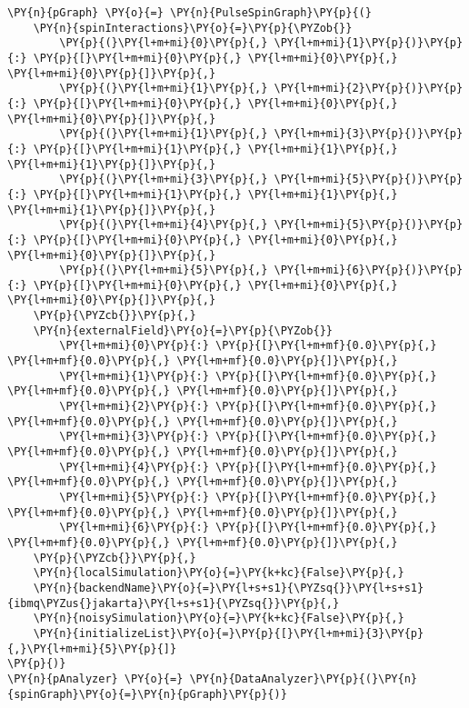     \begin{tcolorbox}[breakable, size=fbox, boxrule=1pt, pad at break*=1mm,colback=cellbackground, colframe=cellborder]
\begin{Verbatim}[commandchars=\\\{\}]
\PY{n}{pGraph} \PY{o}{=} \PY{n}{PulseSpinGraph}\PY{p}{(}
    \PY{n}{spinInteractions}\PY{o}{=}\PY{p}{\PYZob{}}
        \PY{p}{(}\PY{l+m+mi}{0}\PY{p}{,} \PY{l+m+mi}{1}\PY{p}{)}\PY{p}{:} \PY{p}{[}\PY{l+m+mi}{0}\PY{p}{,} \PY{l+m+mi}{0}\PY{p}{,} \PY{l+m+mi}{0}\PY{p}{]}\PY{p}{,}
        \PY{p}{(}\PY{l+m+mi}{1}\PY{p}{,} \PY{l+m+mi}{2}\PY{p}{)}\PY{p}{:} \PY{p}{[}\PY{l+m+mi}{0}\PY{p}{,} \PY{l+m+mi}{0}\PY{p}{,} \PY{l+m+mi}{0}\PY{p}{]}\PY{p}{,}
        \PY{p}{(}\PY{l+m+mi}{1}\PY{p}{,} \PY{l+m+mi}{3}\PY{p}{)}\PY{p}{:} \PY{p}{[}\PY{l+m+mi}{1}\PY{p}{,} \PY{l+m+mi}{1}\PY{p}{,} \PY{l+m+mi}{1}\PY{p}{]}\PY{p}{,}
        \PY{p}{(}\PY{l+m+mi}{3}\PY{p}{,} \PY{l+m+mi}{5}\PY{p}{)}\PY{p}{:} \PY{p}{[}\PY{l+m+mi}{1}\PY{p}{,} \PY{l+m+mi}{1}\PY{p}{,} \PY{l+m+mi}{1}\PY{p}{]}\PY{p}{,}
        \PY{p}{(}\PY{l+m+mi}{4}\PY{p}{,} \PY{l+m+mi}{5}\PY{p}{)}\PY{p}{:} \PY{p}{[}\PY{l+m+mi}{0}\PY{p}{,} \PY{l+m+mi}{0}\PY{p}{,} \PY{l+m+mi}{0}\PY{p}{]}\PY{p}{,}
        \PY{p}{(}\PY{l+m+mi}{5}\PY{p}{,} \PY{l+m+mi}{6}\PY{p}{)}\PY{p}{:} \PY{p}{[}\PY{l+m+mi}{0}\PY{p}{,} \PY{l+m+mi}{0}\PY{p}{,} \PY{l+m+mi}{0}\PY{p}{]}\PY{p}{,}
    \PY{p}{\PYZcb{}}\PY{p}{,}
    \PY{n}{externalField}\PY{o}{=}\PY{p}{\PYZob{}}
        \PY{l+m+mi}{0}\PY{p}{:} \PY{p}{[}\PY{l+m+mf}{0.0}\PY{p}{,} \PY{l+m+mf}{0.0}\PY{p}{,} \PY{l+m+mf}{0.0}\PY{p}{]}\PY{p}{,}
        \PY{l+m+mi}{1}\PY{p}{:} \PY{p}{[}\PY{l+m+mf}{0.0}\PY{p}{,} \PY{l+m+mf}{0.0}\PY{p}{,} \PY{l+m+mf}{0.0}\PY{p}{]}\PY{p}{,}
        \PY{l+m+mi}{2}\PY{p}{:} \PY{p}{[}\PY{l+m+mf}{0.0}\PY{p}{,} \PY{l+m+mf}{0.0}\PY{p}{,} \PY{l+m+mf}{0.0}\PY{p}{]}\PY{p}{,}
        \PY{l+m+mi}{3}\PY{p}{:} \PY{p}{[}\PY{l+m+mf}{0.0}\PY{p}{,} \PY{l+m+mf}{0.0}\PY{p}{,} \PY{l+m+mf}{0.0}\PY{p}{]}\PY{p}{,}
        \PY{l+m+mi}{4}\PY{p}{:} \PY{p}{[}\PY{l+m+mf}{0.0}\PY{p}{,} \PY{l+m+mf}{0.0}\PY{p}{,} \PY{l+m+mf}{0.0}\PY{p}{]}\PY{p}{,}
        \PY{l+m+mi}{5}\PY{p}{:} \PY{p}{[}\PY{l+m+mf}{0.0}\PY{p}{,} \PY{l+m+mf}{0.0}\PY{p}{,} \PY{l+m+mf}{0.0}\PY{p}{]}\PY{p}{,}
        \PY{l+m+mi}{6}\PY{p}{:} \PY{p}{[}\PY{l+m+mf}{0.0}\PY{p}{,} \PY{l+m+mf}{0.0}\PY{p}{,} \PY{l+m+mf}{0.0}\PY{p}{]}\PY{p}{,}
    \PY{p}{\PYZcb{}}\PY{p}{,}
    \PY{n}{localSimulation}\PY{o}{=}\PY{k+kc}{False}\PY{p}{,}
    \PY{n}{backendName}\PY{o}{=}\PY{l+s+s1}{\PYZsq{}}\PY{l+s+s1}{ibmq\PYZus{}jakarta}\PY{l+s+s1}{\PYZsq{}}\PY{p}{,}
    \PY{n}{noisySimulation}\PY{o}{=}\PY{k+kc}{False}\PY{p}{,}
    \PY{n}{initializeList}\PY{o}{=}\PY{p}{[}\PY{l+m+mi}{3}\PY{p}{,}\PY{l+m+mi}{5}\PY{p}{]}
\PY{p}{)}
\PY{n}{pAnalyzer} \PY{o}{=} \PY{n}{DataAnalyzer}\PY{p}{(}\PY{n}{spinGraph}\PY{o}{=}\PY{n}{pGraph}\PY{p}{)}
\end{Verbatim}
\end{tcolorbox}


